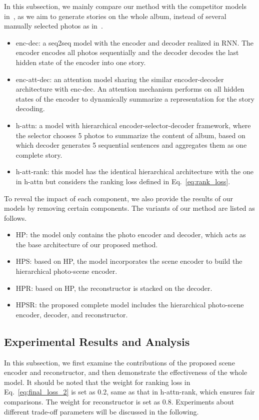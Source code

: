 \documentclass[letterpaper]{article} \usepackage{aaai19}  \usepackage{times}  \usepackage{helvet}  \usepackage{courier}  \usepackage{url}  \usepackage{graphicx}  \usepackage{color}
\begin{document}
In this subsection, we mainly compare our method with the competitor models in~\cite{yu2017hierarchically}, as we aim to generate stories on the whole album, instead of several manually selected photos as in~\cite{wang2018no,liu2017let}.
\begin{itemize}
\item enc-dec: a seq2seq model with the encoder and decoder realized in RNN. The encoder encodes all photos sequentially and the decoder decodes the last hidden state of the encoder into one story.
\item enc-att-dec: an attention model sharing the similar encoder-decoder architecture with enc-dec. An attention mechanism performs on all hidden states of the encoder to dynamically summarize a representation for the story decoding.
\item h-attn: a model with hierarchical encoder-selector-decoder framework, where the selector chooses 5 photos to summarize the content of album, based on which decoder generates 5 sequential sentences and aggregates them as one complete story.
\item h-att-rank: this model has the identical hierarchical architecture with the one in h-attn but considers the ranking loss defined in Eq.~\eqref{eq:rank_loss}.
\end{itemize}

To reveal the impact of each component, we also provide the results of our models by removing certain components. The variants of our method are listed as follows.
\begin{itemize}
\item HP: the model only contains the photo encoder and decoder, which acts as the base architecture of our proposed method.
\item HPS: based on HP, the model incorporates the scene encoder to build the hierarchical photo-scene encoder.
\item HPR: based on HP, the reconstructor is stacked on the decoder.
\item HPSR: the proposed complete model includes the hierarchical photo-scene encoder, decoder, and reconstructor.
\end{itemize}


\subsection{Experimental Results and Analysis}
In this subsection, we first examine the contributions of the proposed scene encoder and reconstructor, and then demonstrate the effectiveness of the whole model. It should be noted that the weight  for ranking loss in Eq.~\eqref{eq:final_loss_2} is set as 0.2, same as that in h-attn-rank, which ensures fair comparisons. The weight  for reconstructor is set as 0.8. Experiments about different trade-off parameters will be discussed in the following.
\end{document}
